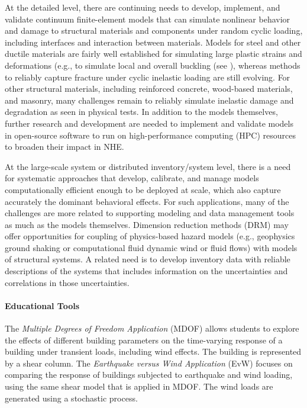At the detailed level, there are continuing needs to develop, implement, and validate continuum finite-element models that can simulate nonlinear behavior and damage to structural materials and components under random cyclic loading, including interfaces and interaction between materials. Models for steel and other ductile materials are fairly well established for simulating large plastic strains and deformations (e.g., to simulate local and overall buckling (see \cite{n.i.s.t.-a.t.c.2018blind}), whereas methods to reliably capture fracture under cyclic inelastic loading are still evolving. For other structural materials, including reinforced concrete, wood-based materials, and masonry, many challenges remain to reliably simulate inelastic damage and degradation as seen in physical tests. In addition to the models themselves, further research and development are needed to implement and validate models in open-source software to run on high-performance computing (HPC) resources to broaden their impact in NHE.

At the large-scale system or distributed inventory/system level, there is a need for systematic approaches that develop, calibrate, and manage models computationally efficient enough to be deployed at scale, which also capture accurately the dominant behavioral effects. For such applications, many of the challenges are more related to supporting modeling and data management tools as much as the models themselves. Dimension reduction methods (DRM) may offer opportunities for coupling of physics-based hazard models (e.g., geophysics ground shaking or computational fluid dynamic wind or fluid flows) with models of structural systems. A related need is to develop inventory data with reliable descriptions of the systems that includes information on the uncertainties and correlations in those uncertainties.

\paragraph{Educational Tools}
The \emph{Multiple Degrees of Freedom Application} (MDOF) allows students to explore the effects of different building parameters on the time-varying response of a building under transient loads, including wind effects. The building is represented by a shear column. The \emph{Earthquake versus Wind Application} (EvW) focuses on comparing the response of buildings subjected to earthquake and wind loading, using the same shear model that is applied in MDOF. The wind loads are generated using a stochastic process.